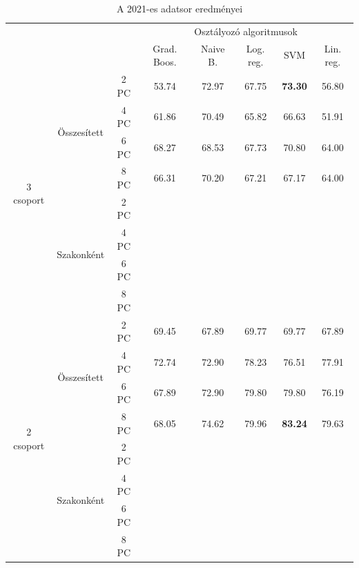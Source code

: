 \documentclass[12pt]{article}
\begin{document}
\begin{table}[H]
\centering
\begin{tabular}{ccc|ccccc}

    &&&\multicolumn{5}{c}{Osztályozó algoritmusok} \\
    &&& Grad. Boos. &  Naive B. & Log. reg.  &  SVM & Lin. reg. \\ 
        \hline
    \multirow{8}{*}{3 csoport}& \multirow{4}{*}{Összesített}&2 PC&53.74&72.97&67.75&\textbf{73.30}&56.80 \\
    												&&4 PC&61.86&70.49&65.82&66.63&51.91\\
    												&&6 PC&68.27&68.53&67.73&70.80&64.00\\
    												&&8 PC&66.31&70.20&67.21&67.17&64.00\\\cline{3-8}%
    						 & \multirow{4}{*}{Szakonként}&2 PC&&&&&\\
    												&&4 PC&&&&&\\
    												&&6 PC&&&&&\\
    												&&8 PC&&&&&\\
    \hline
    \hline
    \multirow{8}{*}{2 csoport}& \multirow{4}{*}{Összesített}&2 PC&69.45&67.89&69.77&69.77&67.89 \\
    												&&4 PC&72.74&72.90&78.23&76.51&77.91\\
    												&&6 PC&67.89&72.90&79.80&79.80&76.19\\
    												&&8 PC&68.05&74.62&79.96&\textbf{83.24}&79.63\\\cline{3-8}
    						 & \multirow{4}{*}{Szakonként}&2 PC&&&&&\\
    												&&4 PC&&&&&\\
    												&&6 PC&&&&&\\
    												&&8 PC&&&&&\\
    												\hline
\end{tabular}
\caption{A 2021-es adatsor eredményei}
\label{tab:multicol}
\end{table}


%	




\begin{thebibliography}{9}
\end{thebibliography}
\end{document}
